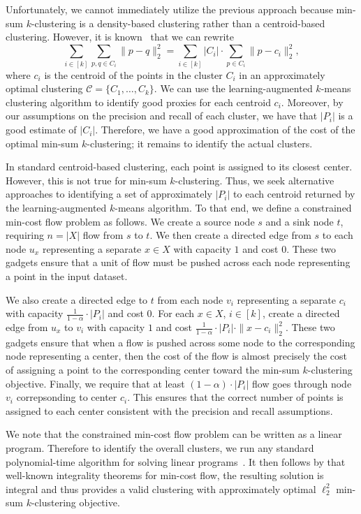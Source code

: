 \documentclass[11pt]{article}
\begin{document}
Unfortunately, we cannot immediately utilize the previous approach because min-sum $k$-clustering is a density-based clustering rather than a centroid-based clustering. 
However, it is known~\cite{InabaKI94} that we can rewrite
\[\sum_{i\in[k]}\sum_{p,q\in C_i}\|p-q\|_2^2=\sum_{i\in[k]}|C_i|\cdot\sum_{p\in C_i}\|p-c_i\|_2^2,\]
where $c_i$ is the centroid of the points in the cluster $C_i$ in an approximately optimal clustering $\mathcal{C}=\{C_1,\ldots,C_k\}$. 
We can use the learning-augmented $k$-means clustering algorithm to identify good proxies for each centroid $c_i$. 
Moreover, by our assumptions on the precision and recall of each cluster, we have that $|P_i|$ is a good estimate of $|C_i|$. 
Therefore, we have a good approximation of the cost of the optimal min-sum $k$-clustering; it remains to identify the actual clusters. 

In standard centroid-based clustering, each point is assigned to its closest center. 
However, this is not true for min-sum $k$-clustering. 
Thus, we seek alternative approaches to identifying a set of approximately $|P_i|$ to each centroid returned by the learning-augmented $k$-means algorithm. 
To that end, we define a constrained min-cost flow problem as follows. 
We create a source node $s$ and a sink node $t$, requiring $n=|X|$ flow from $s$ to $t$. 
We then create a directed edge from $s$ to each node $u_x$ representing a separate $x\in X$ with capacity $1$ and cost $0$. 
These two gadgets ensure that a unit of flow must be pushed across each node representing a point in the input dataset. 

We also create a directed edge to $t$ from each node $v_i$ representing a separate $c_i$ with capacity $\frac{1}{1-\alpha}\cdot|P_i|$ and cost $0$. 
For each $x\in X$, $i\in[k]$, create a directed edge from $u_x$ to $v_i$ with capacity $1$ and cost $\frac{1}{1-\alpha}\cdot|P_i|\cdot\|x-c_i\|_2^2$. 
These two gadgets ensure that when a flow is pushed across some node to the corresponding node representing a center, then the cost of the flow is almost precisely the cost of assigning a point to the corresponding center toward the min-sum $k$-clustering objective. 
Finally, we require that at least $(1-\alpha)\cdot|P_i|$ flow goes through node $v_i$ correpsonding to center $c_i$. 
This ensures that the correct number of points is assigned to each center consistent with the precision and recall assumptions. 

We note that the constrained min-cost flow problem can be written as a linear program. 
Therefore to identify the overall clusters, we run any standard polynomial-time algorithm for solving linear programs~\cite{Karmarkar84,Vaidya89a,Vaidya90,LeeS15,LeeSZ19,CohenLS21,JiangSWZ21}. 
It then follows by that well-known integrality theorems for min-cost flow, the resulting solution is integral and thus provides a valid clustering with approximately optimal $\ell_2^2$ min-sum $k$-clustering objective. 
\end{document}
